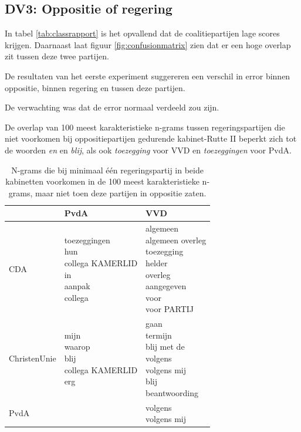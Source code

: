 \subsection{DV3: Oppositie of regering}
In tabel \ref{tab:classrapport} is het opvallend dat de coalitiepartijen lage scores krijgen. Daarnaast laat figuur \ref{fig:confusionmatrix} zien dat er een hoge overlap zit tussen deze twee partijen.\par
De resultaten van het eerste experiment suggereren een verschil in error binnen oppositie, binnen regering en tussen deze partijen.\par
De verwachting was dat de error normaal verdeeld zou zijn.\par
De overlap van 100 meest karakteristieke n-grams tussen regeringspartijen die niet voorkomen bij oppositiepartijen gedurende kabinet-Rutte II beperkt zich tot de woorden \textit{en} en \textit{blij}, als ook \textit{toezegging} voor VVD en \textit{toezeggingen} voor PvdA.\par
\begin{table}[H]
\label{tab:overlapkabinetten}
\caption{N-grams die bij minimaal één regeringspartij in beide kabinetten voorkomen in de 100 meest karakteristieke n-grams, maar niet toen deze partijen in oppositie zaten.}
\centering
\begin{tabular}{|l|l|l|}
\toprule
      &   PvdA &    VVD\\
\midrule
         CDA &    \makecell[l]{toezeggingen\\hun\\collega KAMERLID\\in\\aanpak\\collega} &            \makecell[l]{algemeen\\algemeen overleg\\toezegging\\helder\\overleg\\aangegeven\\voor\\voor PARTIJ} \\ \hline
 ChristenUnie &  \makecell[l]{mijn\\waarop\\blij\\collega KAMERLID\\erg} &        \makecell[l]{gaan\\termijn\\blij met de\\volgens\\volgens mij\\blij\\beantwoording}  \\ \hline
  PvdA &   & \makecell[l]{volgens\\volgens mij}            \\
\bottomrule
\end{tabular}
\end{table}
